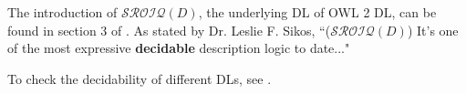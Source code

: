 \documentclass{article}
\begin{document}
The introduction of $\mathcal{SROIQ}(D)$, the underlying DL of OWL 2 DL, can be found in section 3 of \cite{primer}. As stated by Dr. Leslie F. Sikos\cite{OWL2DL_decidable}, 
\quote
``($\mathcal{SROIQ}(D)$) It's one of the most expressive \textbf{decidable} description logic to date..."

To check the decidability of different DLs, see \cite{borgida1996relative}.



\end{document}
